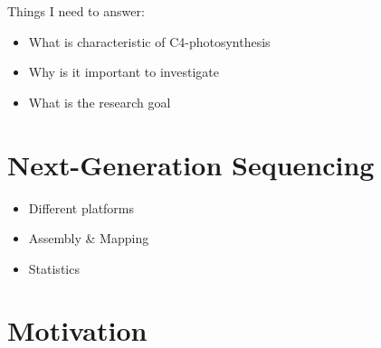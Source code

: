 Things I need to answer:
\begin{itemize}
	\item What is characteristic of C4-photosynthesis
	\item Why is it important to investigate
	\item What is the research goal
\end{itemize}
\section{Next-Generation Sequencing}
\begin{itemize}
	\item Different platforms
	\item Assembly \& Mapping
	\item Statistics
\end{itemize}
\section{Motivation}
